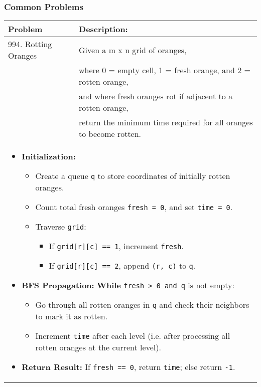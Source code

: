\subsubsection{Common Problems}
\begin{summary}
    \begin{center}
        \begin{tabular}{ll}
            \toprule
            \textbf{Problem} & \textbf{Description:} \\
            \midrule
            994. Rotting Oranges & Given a m x n grid of oranges, \\
            & where 0 = empty cell, 1 = fresh orange, and 2 = rotten orange, \\
            & and where fresh oranges rot if adjacent to a rotten orange, \\
            & return the minimum time required for all oranges to become rotten. \\
            \multicolumn{2}{p{\linewidth}}{
                \begin{itemize}
                    \item \textbf{Initialization:}
                    \begin{itemize}
                        \item Create a queue \texttt{q} to store coordinates of initially rotten oranges.
                        \item Count total fresh oranges \texttt{fresh = 0}, and set \texttt{time = 0}.
                        \item Traverse \texttt{grid}:
                        \begin{itemize}
                            \item If \texttt{grid[r][c] == 1}, increment \texttt{fresh}.
                            \item If \texttt{grid[r][c] == 2}, append \texttt{(r, c)} to \texttt{q}.
                        \end{itemize}
                    \end{itemize}
                    \item \textbf{BFS Propagation:} \textbf{While} \texttt{fresh > 0 and q} is not empty:
                    \begin{itemize}
                        \item Go through all rotten oranges in \texttt{q} and check their neighbors to mark it as rotten.
                        \item Increment \texttt{time} after each level (i.e. after processing all rotten oranges at the current level).
                    \end{itemize}
                    \item \textbf{Return Result:} If \texttt{fresh == 0}, return \texttt{time}; else return \texttt{-1}.
                \end{itemize}                
            } \\
            \midrule
            \bottomrule
        \end{tabular}
    \end{center}
\end{summary}
\newpage

